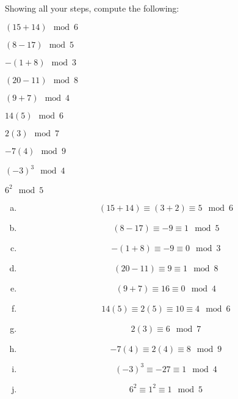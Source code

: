 \documentclass[11pt,letterpaper]{article}
\begin{document}

 Showing all your steps, compute the following:
	\begin{2enumerate}
	\item $(15 + 14) \mod 6$
	\item $(8 - 17) \mod 5$
	\item $-(1 + 8) \mod 3$
	\item $(20 - 11) \mod 8$
	\item $(9 + 7) \mod 4$
	\item $14(5) \mod 6$
	\item $2(3) \mod 7$
	\item $-7(4) \mod 9$
	\item $(-3)^3 \mod 4$
	\item $6^2 \mod 5$
	\end{2enumerate} \pspace

\sol 
\begin{enumerate}[(a)]
\item 
	\[
	(15 + 14) \equiv (3 + 2) \equiv 5 \mod 6
	\]

\item 
	\[
	(8 - 17) \equiv -9 \equiv 1 \mod 5
	\]

\item 
	\[
	-(1 + 8) \equiv -9 \equiv 0 \mod 3
	\]

\item 
	\[
	(20 - 11) \equiv 9 \equiv 1 \mod 8
	\]

\item 
	\[
	(9 + 7) \equiv 16 \equiv 0 \mod 4
	\]

\item 
	\[
	14(5) \equiv 2(5) \equiv 10 \equiv 4 \mod 6
	\]

\item 
	\[
	2(3) \equiv 6 \mod 7
	\]

\item 
	\[
	-7(4) \equiv 2(4) \equiv 8 \mod 9
	\]

\item 
	\[
	(-3)^3 \equiv -27 \equiv 1 \mod 4
	\]

\item 
	\[
	6^2 \equiv 1^2 \equiv 1 \mod 5
	\]
\end{enumerate}



\newpage
\end{document}
